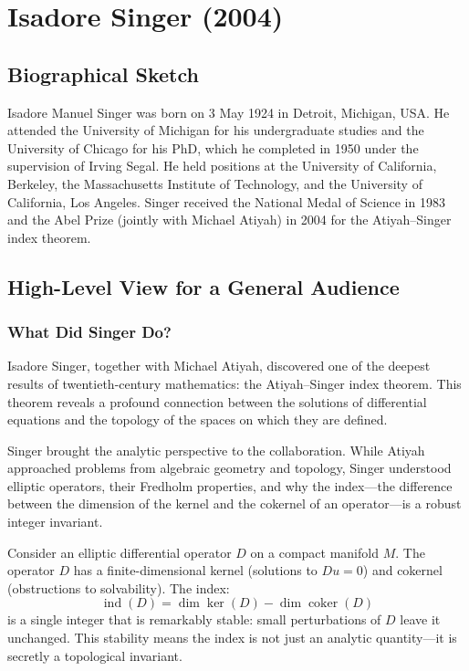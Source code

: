 \chapter{Isadore Singer (2004)}

\section{Biographical Sketch}

Isadore Manuel Singer was born on 3 May 1924 in Detroit, Michigan, USA. He attended the University of Michigan for his undergraduate studies and the University of Chicago for his PhD, which he completed in 1950 under the supervision of Irving Segal. He held positions at the University of California, Berkeley, the Massachusetts Institute of Technology, and the University of California, Los Angeles. Singer received the National Medal of Science in 1983 and the Abel Prize (jointly with Michael Atiyah) in 2004 for the Atiyah--Singer index theorem.

\section{High-Level View for a General Audience}

\subsection{What Did Singer Do?}

Isadore Singer, together with Michael Atiyah, discovered one of the deepest results of twentieth-century mathematics: the Atiyah--Singer index theorem. This theorem reveals a profound connection between the solutions of differential equations and the topology of the spaces on which they are defined.

Singer brought the analytic perspective to the collaboration. While Atiyah approached problems from algebraic geometry and topology, Singer understood elliptic operators, their Fredholm properties, and why the index---the difference between the dimension of the kernel and the cokernel of an operator---is a robust integer invariant.

Consider an elliptic differential operator $D$ on a compact manifold $M$. The operator $D$ has a finite-dimensional kernel (solutions to $Du = 0$) and cokernel (obstructions to solvability). The index:
\[
\operatorname{ind}(D) = \dim \ker(D) - \dim \operatorname{coker}(D)
\]
is a single integer that is remarkably stable: small perturbations of $D$ leave it unchanged. This stability means the index is not just an analytic quantity---it is secretly a topological invariant.

